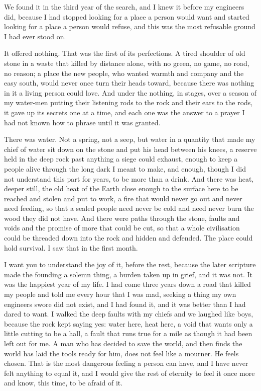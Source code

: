 
We found it in the third year of the search, and I knew it before my engineers did, because I had stopped looking for a place a person would want and started looking for a place a person would refuse, and this was the most refusable ground I had ever stood on.\par

It offered nothing. That was the first of its perfections. A tired shoulder of old stone in a waste that killed by distance alone, with no green, no game, no road, no reason; a place the new people, who wanted warmth and company and the easy south, would never once turn their heads toward, because there was nothing in it a living person could love. And under the nothing, in stages, over a season of my water-men putting their listening rods to the rock and their ears to the rods, it gave up its secrets one at a time, and each one was the answer to a prayer I had not known how to phrase until it was granted.\par

There was water. Not a spring, not a seep, but water in a quantity that made my chief of water sit down on the stone and put his head between his knees, a reserve held in the deep rock past anything a siege could exhaust, enough to keep a people alive through the long dark I meant to make, and enough, though I did not understand this part for years, to be more than a drink. And there was heat, deeper still, the old heat of the Earth close enough to the surface here to be reached and stolen and put to work, a fire that would never go out and never need feeding, so that a sealed people need never be cold and need never burn the wood they did not have. And there were paths through the stone, faults and voids and the promise of more that could be cut, so that a whole civilisation could be threaded down into the rock and hidden and defended. The place could hold survival. I saw that in the first month.\par

I want you to understand the joy of it, before the rest, because the later scripture made the founding a solemn thing, a burden taken up in grief, and it was not. It was the happiest year of my life. I had come three years down a road that killed my people and told me every hour that I was mad, seeking a thing my own engineers swore did not exist, and I had found it, and it was better than I had dared to want. I walked the deep faults with my chiefs and we laughed like boys, because the rock kept saying yes: water here, heat here, a void that wants only a little cutting to be a hall, a fault that runs true for a mile as though it had been left out for me. A man who has decided to save the world, and then finds the world has laid the tools ready for him, does not feel like a mourner. He feels chosen. That is the most dangerous feeling a person can have, and I have never felt anything to equal it, and I would give the rest of eternity to feel it once more and know, this time, to be afraid of it.\par

